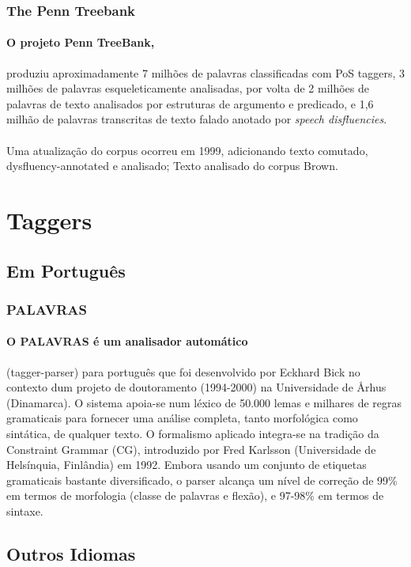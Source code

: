 \documentclass[a4paper, 10pt]{article}
\begin{document}
           \subsubsection{The Penn Treebank} 
           		\paragraph{O projeto Penn TreeBank,} produziu aproximadamente 7 milhões de palavras classificadas com PoS taggers, 3 milhões de palavras esqueleticamente analisadas, por volta de 2 milhões de palavras de texto analisados por estruturas de argumento e predicado, e 1,6 milhão de palavras transcritas de texto falado anotado por \textit{speech disfluencies}. 
                \paragraph{}Uma atualização do corpus ocorreu em 1999, adicionando texto comutado, dysfluency-annotated e analisado; Texto analisado do corpus Brown.
    \section{Taggers}
    	\subsection{Em Português}
        	\subsubsection{PALAVRAS}
            	\paragraph{O PALAVRAS é um analisador automático} (tagger-parser) para português que foi desenvolvido por Eckhard Bick no contexto dum projeto de doutoramento (1994-2000) na Universidade de Århus (Dinamarca). O sistema apoia-se num léxico de 50.000 lemas e milhares de regras gramaticais para fornecer uma análise completa, tanto morfológica como sintática, de qualquer texto. O formalismo aplicado integra-se na tradição da Constraint Grammar (CG), introduzido por Fred Karlsson (Universidade de Helsínquia, Finlândia) em 1992. Embora usando um conjunto de etiquetas gramaticais bastante diversificado, o parser alcança um nível de correção de 99\% em termos de morfologia (classe de palavras e flexão), e 97-98\% em termos de sintaxe.

        \subsection{Outros Idiomas}
\end{document}
